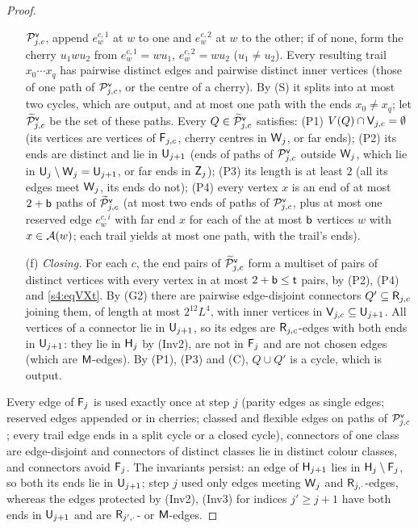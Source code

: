 \begin{proof}
\begin{itemize}
  $\vPaths_{j,c}$, append $e^{c,1}_w$ at $w$ to one and $e^{c,2}_w$ at $w$ to the other; if of none, form the cherry
  $u_1wu_2$ from $e^{c,1}_w=wu_1$, $e^{c,2}_w=wu_2$ ($u_1\ne u_2$). Every resulting trail $x_0\cdots x_q$ has pairwise
  distinct edges and pairwise distinct inner vertices (those of one path of $\vPaths_{j,c}$, or the centre of a
  cherry). By \textup{(S)} it splits into at most two cycles, which are output, and at most one path with the ends
  $x_0\ne x_q$; let $\vPathsQ_{j,c}$ be the set of these paths. Every $Q\in\vPathsQ_{j,c}$ satisfies:
  (P1) $V(Q)\cap\vV_{j,c}=\emptyset$ (its vertices are vertices of $\vF_{j,c}$, cherry centres in $\vW_j$, or far
  ends); (P2) its ends are distinct and lie in $\vU_{j+1}$ (ends of paths of $\vPaths_{j,c}$ outside $\vW_j$, which
  lie in $\vU_j\setminus\vW_j=\vU_{j+1}$, or far ends in $\vZ_j$); (P3) its length is at least $2$ (all its edges meet
  $\vW_j$, its ends do not); (P4) every vertex $x$ is an end of at most $2+\vb$ paths of $\vPathsQ_{j,c}$ (at most
  two ends of paths of $\vPaths_{j,c}$, plus at most one reserved edge $e^{c,i}_w$ with far end $x$ for each of the at
  most $\vb$ vertices $w$ with $x\in\Aw(w)$; each trail yields at most one path, with the trail's ends).
\item[(f)] \emph{Closing.} For each $c$, the end pairs of $\vPathsQ_{j,c}$ form a multiset of pairs of distinct
  vertices with every vertex in at most $2+\mathsf{b}\le\mathsf{t}$ pairs, by (P2), (P4) and \eqref{s4:eqVXt}. By (G2) there are
  pairwise edge-disjoint connectors $Q'\subseteq\mathsf{R}_{j,c}$ joining them, of length at most $2^{12}L^4$, with inner
  vertices in $\mathsf{V}_{j,c}\subseteq\mathsf{U}_{j+1}$. All vertices of a connector lie in $\vU_{j+1}$, so its edges are
  $\mathsf{R}_{j,c}$-edges with both ends in $\vU_{j+1}$: they lie in $\mathsf{H}_j$ by (Inv2), are not in $\mathsf{F}_j$ and are not
  chosen edges (which are $\mathsf{M}$-edges). By (P1), (P3) and \textup{(C)}, $Q\cup Q'$ is a cycle, which is output.
\end{itemize}
Every edge of $\mathsf{F}_j$ is used exactly once at step $j$ (parity edges as single edges; reserved edges appended or in
cherries; classed and flexible edges on paths of $\vPaths_{j,c}$; every trail edge ends in a split cycle or a closed
cycle), connectors of one class are edge-disjoint and connectors of distinct classes lie in distinct colour classes,
and connectors avoid $\mathsf{F}_j$. The invariants persist: an edge of $\mathsf{H}_{j+1}$ lies in
$\mathsf{H}_j\setminus\mathsf{F}_j$, so both its ends lie in $\vU_{j+1}$; step $j$ used only edges meeting $\vW_j$ and
$\mathsf{R}_{j,\cdot}$-edges, whereas the edges protected by (Inv2), (Inv3) for indices $j'\ge j+1$ have both ends in
$\vU_{j+1}$ and are $\mathsf{R}_{j',\cdot}$- or $\mathsf{M}$-edges.


\end{proof}
